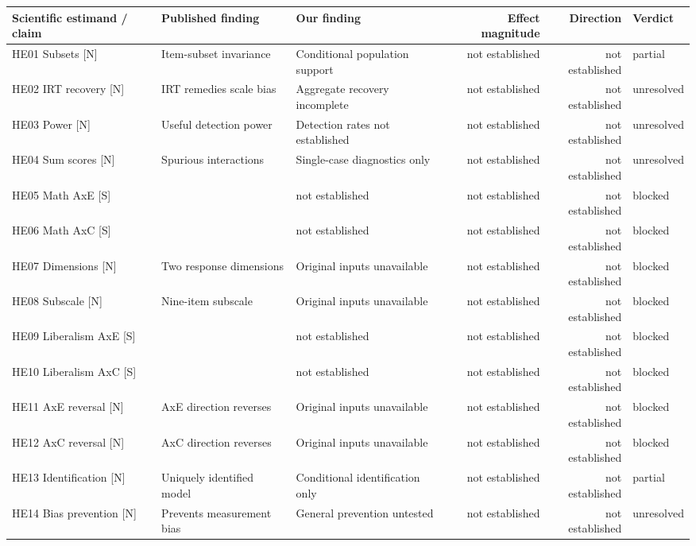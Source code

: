 \documentclass[11pt]{article}
\renewcommand{\arraystretch}{1.25}
\begin{document}
{\fontsize{8}{9.1}\selectfont\setlength{\tabcolsep}{2pt}\renewcommand{\arraystretch}{1.0}
\noindent\begin{tabular}{@{}>{\raggedright\arraybackslash}p{95pt}>{\raggedright\arraybackslash}p{105pt}>{\raggedright\arraybackslash}p{105pt}rrl@{}}\toprule
Scientific estimand / claim & Published finding & Our finding & Effect magnitude & Direction & Verdict\\\midrule
HE01 Subsets [N] & Item-subset invariance & Conditional population support & not established & not established & partial\\
HE02 IRT recovery [N] & IRT remedies scale bias & Aggregate recovery incomplete & not established & not established & unresolved\\
HE03 Power [N] & Useful detection power & Detection rates not established & not established & not established & unresolved\\
HE04 Sum scores [N] & Spurious interactions & Single-case diagnostics only & not established & not established & unresolved\\
HE05 Math AxE [S] & 2.0837 & not established & not established & not established & blocked\\
HE06 Math AxC [S] & 2.6159 & not established & not established & not established & blocked\\
HE07 Dimensions [N] & Two response dimensions & Original inputs unavailable & not established & not established & blocked\\
HE08 Subscale [N] & Nine-item subscale & Original inputs unavailable & not established & not established & blocked\\
HE09 Liberalism AxE [S] & -2.81 & not established & not established & not established & blocked\\
HE10 Liberalism AxC [S] & 0.54 & not established & not established & not established & blocked\\
HE11 AxE reversal [N] & AxE direction reverses & Original inputs unavailable & not established & not established & blocked\\
HE12 AxC reversal [N] & AxC direction reverses & Original inputs unavailable & not established & not established & blocked\\
HE13 Identification [N] & Uniquely identified model & Conditional identification only & not established & not established & partial\\
HE14 Bias prevention [N] & Prevents measurement bias & General prevention untested & not established & not established & unresolved\\

\end{tabular}}
\end{document}
